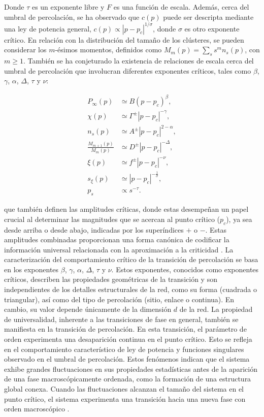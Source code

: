 Donde $\tau$ es un exponente libre y $F$ es una función de escala.  Además, cerca del umbral de percolación, se ha observado que  $c(p)$ puede ser descripta mediante una ley de potencia general, $c (p) \propto \left|p-p_c \right|^{1/\sigma}$, donde $\sigma$ es otro exponente crítico.  En relación con la distribución del tamaño de los clústeres, se pueden considerar los $m$-ésimos momentos, definidos como $M_m(p) = \sum_{s}s^mn_s(p)$, con $m \geq 1$. También se ha conjeturado la existencia de relaciones de escala cerca del umbral de percolación que involucran diferentes exponentes críticos, tales como $\beta$, $\gamma$, $\alpha$, $\Delta$,  $\tau$ y $\nu$:


\begin{align} 
	P_\infty(p) & \simeq B\left(p-p_c\right)^\beta, \label{eq:6a}\\ 
	\chi(p)  & \simeq \Gamma^{\pm}\left| p-p_c \right|^{-\gamma}, \label{eq:6b} \\
	n_s(p) & \simeq A^{\pm}  \left| p-p_c \right|^{2-\alpha}, \label{eq:6c} \\
	\frac{M_{m+1}(p)}{M_m(p)} &\simeq D^{\pm} \left| p-p_c \right|^{-\Delta}, \label{eq:6d}\\
	\xi(p) &\simeq f^{\pm}\left| p-p_c \right|^{-\nu}, \label{eq:6e} \\
	s_\xi(p) &\simeq \left| p-p_c \right|^{-\frac{1}{\sigma}}, \label{eq:6f}\\
	p_s &\propto s^{-\tau}.
	\end{align}
	
	
que también definen las amplitudes críticas, donde estas desempeñan un papel crucial al determinar las magnitudes que se acercan al punto crítico ($p_c$), ya sea desde arriba o desde abajo, indicadas por los superíndices $+$ o $-$. Estas amplitudes combinadas proporcionan una forma canónica de codificar la información universal relacionada con la aproximación a la criticidad \cite{aharony_universal_1980}. La caracterización del comportamiento crítico de la transición de percolación se basa en los exponentes  $\beta$, $\gamma$, $\alpha$, $\Delta$,  $\tau$ y $\nu$. Estos exponentes, conocidos como exponentes críticos, describen las propiedades geométricas de la transición y son independientes de los detalles estructurales de la red, como su forma (cuadrada o triangular), así como del tipo de percolación (sitio, enlace o continua). En cambio, su valor depende únicamente de la dimensión $d$ de la red.  La propiedad de universalidad, inherente a las transiciones de fase en general, también se manifiesta en la transición de percolación. En esta transición, el parámetro de orden experimenta una desaparición continua en el punto crítico. Esto se refleja en el comportamiento característico de ley de potencia y funciones singulares observado en el umbral de percolación. Estos fenómenos indican que el sistema exhibe grandes fluctuaciones en sus propiedades estadísticas antes de la aparición de una fase macroscópicamente ordenada, como la formación de una estructura global conexa. Cuando las fluctuaciones alcanzan el tamaño del sistema en el punto crítico, el sistema experimenta una transición hacia una nueva fase con orden macroscópico \cite{barrat_dynamical_2008}.

